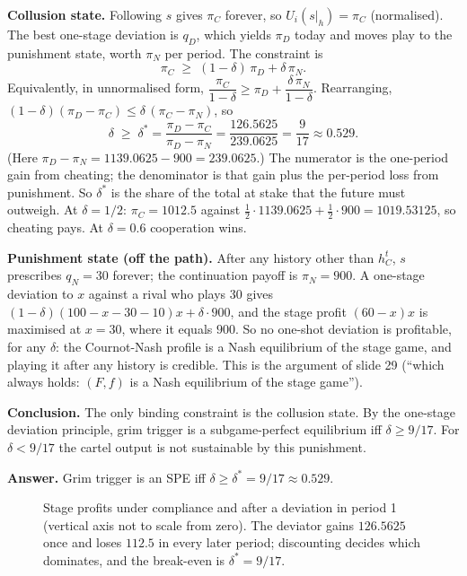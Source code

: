 \documentclass[11pt,a4paper]{article}
\newcommand{\answer}[1]{\begin{tcolorbox}[colback=ans!5,colframe=ans,boxrule=0.6pt,
  left=5pt,right=5pt,top=3pt,bottom=3pt]\textbf{Answer.} #1\end{tcolorbox}}
\begin{document}
\textbf{Collusion state.} Following $s$ gives $\pi_C$ forever, so $U_i(s|_h) = \pi_C$ (normalised).
The best one-stage deviation is $q_D$, which yields $\pi_D$ today and moves play to the punishment state,
worth $\pi_N$ per period. The constraint is
\[
\pi_C \;\ge\; (1-\delta)\,\pi_D + \delta\,\pi_N.
\]
Equivalently, in unnormalised form, $\dfrac{\pi_C}{1-\delta} \ge \pi_D + \dfrac{\delta\,\pi_N}{1-\delta}$.
Rearranging, $(1-\delta)(\pi_D - \pi_C) \le \delta\,(\pi_C - \pi_N)$, so
\[
\delta \;\ge\; \delta^* = \frac{\pi_D - \pi_C}{\pi_D - \pi_N} = \frac{126.5625}{239.0625} = \frac{9}{17} \approx 0.529.
\]
(Here $\pi_D - \pi_N = 1139.0625 - 900 = 239.0625$.) The numerator is the one-period gain from cheating;
the denominator is that gain plus the per-period loss from punishment. So $\delta^*$ is the share of the
total at stake that the future must outweigh. At $\delta = 1/2$: $\pi_C = 1012.5$ against
$\tfrac12\cdot 1139.0625 + \tfrac12\cdot 900 = 1019.53125$, so cheating pays. At $\delta = 0.6$
cooperation wins.

\textbf{Punishment state (off the path).} After any history other than $h^t_C$, $s$ prescribes $q_N = 30$
forever; the continuation payoff is $\pi_N = 900$. A one-stage deviation to $x$ against a rival who plays
$30$ gives $(1-\delta)(100 - x - 30 - 10)x + \delta\cdot 900$, and the stage profit $(60 - x)x$ is maximised
at $x = 30$, where it equals $900$. So no one-shot deviation is profitable, for any $\delta$: the
Cournot-Nash profile is a Nash equilibrium of the stage game, and playing it after any history is
credible. This is the argument of slide 29 (``which always holds: $(F,f)$ is a Nash equilibrium of
the stage game'').

\textbf{Conclusion.} The only binding constraint is the collusion state. By the one-stage deviation
principle, grim trigger is a subgame-perfect equilibrium iff $\delta \ge 9/17$. For $\delta < 9/17$
the cartel output is not sustainable by this punishment.

\answer{Grim trigger is an SPE iff $\delta \ge \delta^* = 9/17 \approx 0.529$.}

\begin{figure}[ht]
\centering
{}
\caption{Stage profits under compliance and after a deviation in period 1 (vertical axis not to scale from
zero). The deviator gains $126.5625$ once and loses $112.5$ in every later period; discounting decides
which dominates, and the break-even is $\delta^* = 9/17$.}
\end{figure}
\end{document}
